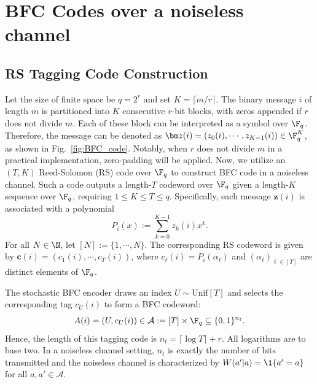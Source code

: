\section{BFC Codes over a noiseless channel}
\label{sec:noiseless}
\subsection{RS Tagging Code Construction}
\label{sec:tagging_code}
Let the size of finite space be $q=2^r$ and set $K=\lceil m/r\rceil$. The binary message $i$ of length $m$ is partitioned into $K$ consecutive $r$-bit blocks, with zeros appended if $r$ does not divide $m$. Each of these block can be interpreted as a symbol over $\F_q$. Therefore, the message can be denoted as $\bm z(i)=(z_0(i),\cdots,z_{K-1}(i))\in \F_q^K$, as shown in Fig.~\ref{fig:BFC_code}. Notably, when $r$ does not divide $m$ in a practical implementation, zero-padding will be applied. Now, we utilize an $(T,K)$ Reed-Solomon (RS) code over $\F_q$ to construct BFC code in a noiseless channel. Such a code outputs a length-$T$ codeword over $\F_q$ given a length-$K$ sequence over $\F_q$, requiring $1\leq K\leq T\leq q$. Specifically, each message $\bm z(i)$ is associated with a polynomial
\begin{equation}
    P_i(x):=
    \sum_{k=0}^{K-1}z_k(i)x^k.
\end{equation}
For all $N\in\N$, let $[N]:=\{1,\cdots,N\}$. The corresponding RS codeword is given by $\bm c(i)=(c_1(i),\cdots,c_T(i))$, where $c_\ell(i)=P_i(\alpha_\ell)$ and $(\alpha_\ell)_{\ell\in[T]}$ are distinct elements of $\F_q$.



The stochastic BFC encoder draws an index $U\sim\mathrm{Unif}[T]$ and selects the corresponding tag $c_U(i)$ to form a BFC codeword:
\begin{equation}
    A(i) = (U, c_U(i))\in \mathcal{A}:= [T]\times \F_q\subseteq\{0,1\}^{n_t}.
\end{equation}
Hence, the length of this tagging code is $n_t = \lceil\log T\rceil + r$. All logarithms are to base two. In a noiseless channel setting, $n_t$ is exactly the number of bits transmitted and the noiseless channel is characterized by $W(a'|a) = \1\{a'=a\}$ for all $a,a'\in\mathcal{A}$.

